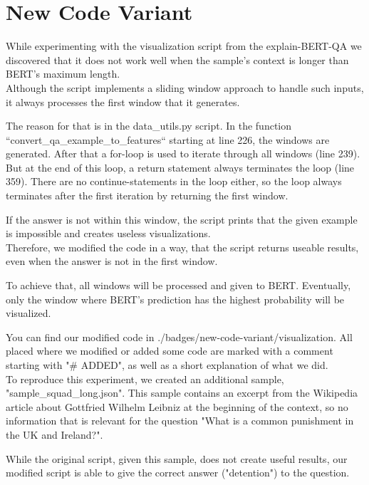 \documentclass{article}
\begin{document}
	\section{New Code Variant}
	While experimenting with the visualization script from the explain-BERT-QA we discovered that it does not work well when the sample's context is longer than BERT's maximum length.\\
	
	Although the script implements a sliding window approach to handle such inputs, it always processes the first window that it generates.
	
	The reason for that is in the data\_utils.py script. In the function “convert\_qa\_example\_to\_features“ starting at line 226, the windows are generated. After that a for-loop is used to iterate through all windows (line 239). But at the end of this loop, a return statement always terminates the loop (line 359). There are no continue-statements in the loop either, so the loop always terminates after the first iteration by returning the first window.
	
	If the answer is not within this window, the script prints that the given example is impossible and creates useless visualizations.\\
	
	Therefore, we modified the code in a way, that the script returns useable results, even when the answer is not in the first window.
	
	To achieve that, all windows will be processed and given to BERT. Eventually, only the window where BERT’s prediction has the highest probability will be visualized. 
	
	You can find our modified code in ./badges/new-code-variant/visualization. All placed where we modified or added some code are marked with a comment starting with "\# ADDED", as well as a short explanation of what we did.\\
	
	To reproduce this experiment, we created an additional sample, "sample\_squad\_long.json". This sample contains an excerpt from the Wikipedia article about Gottfried Wilhelm Leibniz at the beginning of the context, so no information that is relevant for the question "What is a common punishment in the UK and Ireland?".
	
	While the original script, given this sample, does not create useful results, our modified script is able to give the correct answer ("detention") to the question.
	
	
\end{document}
